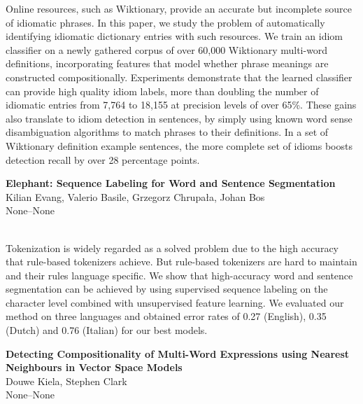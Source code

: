 \documentclass[twoside,makeidx]{book}
\begin{document}
\nopagebreak%
\noindent%
{\small Online resources, such as Wiktionary, provide an accurate but incomplete source of idiomatic phrases.  In this paper, we study the problem of automatically identifying idiomatic dictionary entries with such resources. We train an idiom classifier on a newly gathered corpus of over 60,000 Wiktionary multi-word definitions, incorporating features that model whether phrase meanings are constructed compositionally. Experiments demonstrate that the learned classifier can provide high quality idiom labels, more than doubling the number of idiomatic entries from 7,764 to 18,155 at precision levels of over 65\%.  These gains also translate to idiom detection in sentences, by simply using known word sense disambiguation algorithms to match phrases to their definitions.  In a set of Wiktionary definition example sentences, the more complete set of idioms boosts detection recall by over 28 percentage points.}
\par\vspace{2em}\noindent%
\begin{minipage}{\linewidth}%
\begin{center}
\textbf{\normalsize Elephant: Sequence Labeling for Word and Sentence Segmentation}\\
\normalsize  Kilian Evang,  Valerio Basile,  Grzegorz Chrupa{\l}a,  Johan Bos\\
{\small None--None}\\
\end{center}
\end{minipage}\\[0.5em]
\nopagebreak%
\noindent%
{\small Tokenization is widely regarded as a solved problem due to the high accuracy that rule-based tokenizers achieve. But rule-based tokenizers are hard to maintain and their rules language specific. We show that high-accuracy word and sentence segmentation can be achieved by using supervised sequence labeling on the character level combined with unsupervised feature learning. We evaluated our method on three languages and obtained error rates of 0.27 \textperthousand (English), 0.35 \textperthousand (Dutch) and 0.76 \textperthousand (Italian) for our best models.}
\par\vspace{2em}\noindent%
\begin{minipage}{\linewidth}%
\begin{center}
\textbf{\normalsize Detecting Compositionality of Multi-Word Expressions using Nearest Neighbours in Vector Space Models}\\
\normalsize  Douwe Kiela,  Stephen Clark\\
{\small None--None}\\
\end{center}
\end{minipage}\\[0.5em]
\end{document}

